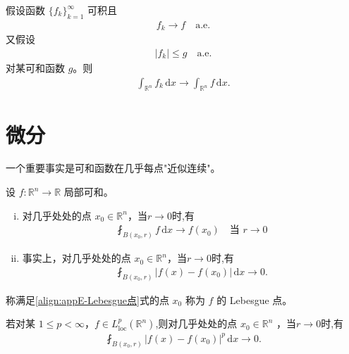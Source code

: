 \documentclass[../main.tex]{subfiles}
\begin{document}
\begin{theorem}[控制收敛定理。]\label{theorem:appE-控制收敛}假设函数 $\{f_k\}_{k=1}^\infty$ 可积且
\begin{align*}
f_k\to f \quad \text{a.e.}
\end{align*}
又假设
\begin{align*}
|f_k|\leqslant g \quad \text{a.e.}
\end{align*}
对某可和函数 $g$。则
\begin{align*}
\int_{\mathbb{R}^n}f_k\,\mathrm{d}x\to\int_{\mathbb{R}^n}f\,\mathrm{d}x.
\end{align*}
\end{theorem}

\section{微分}\label{section:appE-微分}

一个重要事实是可和函数在几乎每点"近似连续"。

\begin{theorem}[Lebesgue微分定理]\label{theorem:appE-Lebesgue微分}
设 $f:\mathbb{R}^n\to\mathbb{R}$ 局部可和。
\begin{enumerate}[(i)]
\item 对几乎处处的点 $x_0\in\mathbb{R}^n$，当$r\to 0$时,有
\begin{align}
\fint_{B(x_0,r)}f\,\mathrm{d}x\to f(x_0) \quad \text{当 } r\to 0
\label{align:appE-平均收敛}
\end{align}

\item 事实上，对几乎处处的点 $x_0\in\mathbb{R}^n$，当$r\to 0$时,有
\begin{align}
\fint_{B(x_0,r)}|f(x)-f(x_0)|\,\mathrm{d}x\to 0 .
\label{align:appE-Lebesgue点}
\end{align}
\end{enumerate}
称满足\eqref{align:appE-Lebesgue点}式的点 $x_0$ 称为 $f$ 的 Lebesgue 点。
\end{theorem}

\begin{theorem}[Lebesgue微分定理]\label{theorem:appE-Lebesgue微分1}
若对某 $1\leqslant p<\infty$，$f\in L^p_{\mathrm{loc}}(\mathbb{R}^n)$,则对几乎处处的点 $x_0\in\mathbb{R}^n$ ，当$r\to 0$时,有
\begin{align*}
\fint_{B(x_0,r)}|f(x)-f(x_0)|^p\,\mathrm{d}x\to 0.
\end{align*}
\end{theorem}
\end{document}
